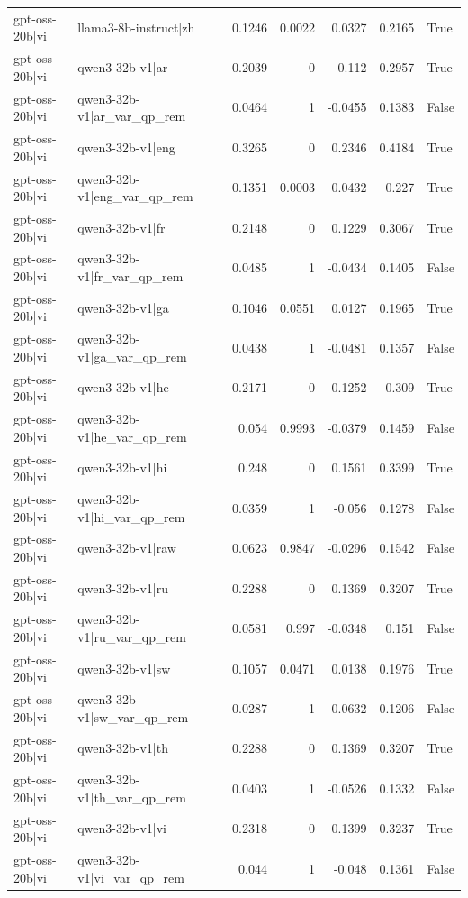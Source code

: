 \begin{table}
\begin{tabular}{l l r r r r l}
gpt-oss-20b|vi & llama3-8b-instruct|zh & 0.1246 & 0.0022 & 0.0327 & 0.2165 & True \\
gpt-oss-20b|vi & qwen3-32b-v1|ar & 0.2039 & 0 & 0.112 & 0.2957 & True \\
gpt-oss-20b|vi & qwen3-32b-v1|ar_var_qp_rem & 0.0464 & 1 & -0.0455 & 0.1383 & False \\
gpt-oss-20b|vi & qwen3-32b-v1|eng & 0.3265 & 0 & 0.2346 & 0.4184 & True \\
gpt-oss-20b|vi & qwen3-32b-v1|eng_var_qp_rem & 0.1351 & 0.0003 & 0.0432 & 0.227 & True \\
gpt-oss-20b|vi & qwen3-32b-v1|fr & 0.2148 & 0 & 0.1229 & 0.3067 & True \\
gpt-oss-20b|vi & qwen3-32b-v1|fr_var_qp_rem & 0.0485 & 1 & -0.0434 & 0.1405 & False \\
gpt-oss-20b|vi & qwen3-32b-v1|ga & 0.1046 & 0.0551 & 0.0127 & 0.1965 & True \\
gpt-oss-20b|vi & qwen3-32b-v1|ga_var_qp_rem & 0.0438 & 1 & -0.0481 & 0.1357 & False \\
gpt-oss-20b|vi & qwen3-32b-v1|he & 0.2171 & 0 & 0.1252 & 0.309 & True \\
gpt-oss-20b|vi & qwen3-32b-v1|he_var_qp_rem & 0.054 & 0.9993 & -0.0379 & 0.1459 & False \\
gpt-oss-20b|vi & qwen3-32b-v1|hi & 0.248 & 0 & 0.1561 & 0.3399 & True \\
gpt-oss-20b|vi & qwen3-32b-v1|hi_var_qp_rem & 0.0359 & 1 & -0.056 & 0.1278 & False \\
gpt-oss-20b|vi & qwen3-32b-v1|raw & 0.0623 & 0.9847 & -0.0296 & 0.1542 & False \\
gpt-oss-20b|vi & qwen3-32b-v1|ru & 0.2288 & 0 & 0.1369 & 0.3207 & True \\
gpt-oss-20b|vi & qwen3-32b-v1|ru_var_qp_rem & 0.0581 & 0.997 & -0.0348 & 0.151 & False \\
gpt-oss-20b|vi & qwen3-32b-v1|sw & 0.1057 & 0.0471 & 0.0138 & 0.1976 & True \\
gpt-oss-20b|vi & qwen3-32b-v1|sw_var_qp_rem & 0.0287 & 1 & -0.0632 & 0.1206 & False \\
gpt-oss-20b|vi & qwen3-32b-v1|th & 0.2288 & 0 & 0.1369 & 0.3207 & True \\
gpt-oss-20b|vi & qwen3-32b-v1|th_var_qp_rem & 0.0403 & 1 & -0.0526 & 0.1332 & False \\
gpt-oss-20b|vi & qwen3-32b-v1|vi & 0.2318 & 0 & 0.1399 & 0.3237 & True \\
gpt-oss-20b|vi & qwen3-32b-v1|vi_var_qp_rem & 0.044 & 1 & -0.048 & 0.1361 & False \\

\end{tabular}
\end{table}
